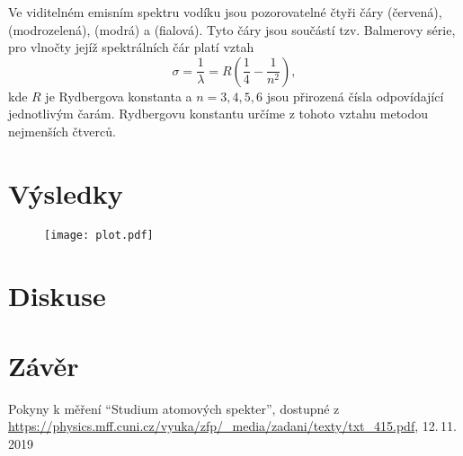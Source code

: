 \documentclass{protokol}
\begin{document}
    Ve viditelném emisním spektru vodíku jsou pozorovatelné čtyři čáry  (červená),  (modrozelená),  (modrá) a  (fialová).
    Tyto čáry jsou součástí tzv. Balmerovy série, pro vlnočty jejíž spektrálních čár platí vztah
    \begin{equation} \label{eq:rydberg}
        \sigma = \frac{1}{\lambda} = R \left( \frac{1}{4} - \frac{1}{n^2} \right),
    \end{equation}
    kde $R$ je Rydbergova konstanta a $n = 3, 4, 5, 6$ jsou přirozená čísla odpovídající jednotlivým čarám.
    Rydbergovu konstantu určíme z tohoto vztahu metodou nejmenších čtverců.



    \section*{Výsledky}

    \begin{figure}[h]
        \centering
        \texttt{[image: plot.pdf]}
        \caption{}
        \label{fig:fig}
    \end{figure}


    \section*{Diskuse}



    \section*{Závěr}



    \begin{thebibliography}{}

        Pokyny k měření ``Studium atomových spekter'', dostupné z\\ \url{https://physics.mff.cuni.cz/vyuka/zfp/_media/zadani/texty/txt_415.pdf}, 12.\,11.\,2019

    \end{thebibliography}
\end{document}
